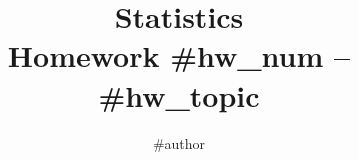 \documentclass[fleqn]{article}
\title{
	Statistics \\
	\medskip
	\large Homework #{hw_num} -- #{hw_topic}
}
\author{#{author}}
\begin{document}
\maketitle

\begin{answers}

    \item

\end{answers}
\end{document}
